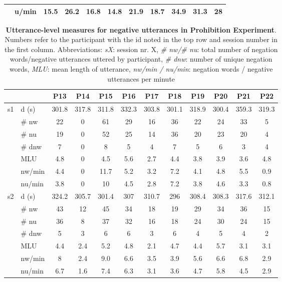 \begin{screenonly}
\begin{table*}[h]
\begin{tabular*}{\hsize}{@{\extracolsep{\fill}}lllllllllll}
    & u/min & 15.5 & 26.2 & 16.8 & 14.8 & 21.9 & 18.7 & 34.9 & 31.3 & 28 \\
    \bottomrule
  \end{tabular*}
\end{table*}
\begin{table*}[h]
\caption{\textbf{Utterance-level measures for negative utterances in Prohibition Experiment}. Numbers refer to the participant with
    the id noted in the top row and session number in the first column. Abbreviations: \textsl{sX}: session nr. X, \textsl{\# nw/\# nu}: total
    number of negation words/negative utterances uttered by participant, \textsl{\# dnw}: number of unique negation words, \textsl{MLU}: mean
    length of utterance, \textsl{nw/min / nu/min}: negation words / negative utterances per minute}
  \begin{tabular*}{\hsize}{@{\extracolsep{\fill}}clcccccccccc}
    \toprule
    & & P13 & P14 & P15 & P16 & P17 & P18 & P19 & P20 & P21 & P22\\
    \midrule
    \multirow{7}{*}{s1} & d (s) & 301.8 & 317.8 & 311.8 & 332.3 & 303.8 & 301.1 & 318.9 & 300.4 & 359.3 & 319.3\\
    & \# nw & 22 & 0 & 61 & 29 & 16 & 36 & 22 & 24 & 33 & 5\\
    & \# nu & 19 & 0 & 52 & 25 & 14 & 36 & 20 & 23 & 20 & 4\\
    & \# dnw & 7 & 0 & 8 & 5 & 4 & 7 & 5 & 6 & 3 & 4\\
    & MLU & 4.8 & 0 & 4.5 & 5.6 & 2.7 & 4.4 & 3.8 & 3.9 & 3.6 & 4.8\\
    & nw/min & 4.4 & 0 & 11.7 & 5.2 & 3.2 & 7.2 & 4.1 & 4.8 & 5.5 & 0.9\\
    & nu/min & 3.8 & 0 & 10 & 4.5 & 2.8 & 7.2 & 3.8 & 4.6 & 3.3 & 0.8\\
    \cmidrule{2-12}
    \multirow{7}{*}{s2} & d (s) & 324.2 & 305.7 & 301.4 & 307 & 310.7 & 296 & 308.4 & 308.3 & 317.6 & 312.1\\
    & \# nw & 43 & 12 & 45 & 34 & 18 & 19 & 29 & 34 & 36 & 15\\
    & \# nu & 36 & 8 & 37 & 32 & 16 & 18 & 24 & 30 & 24 & 15\\
    & \# dnw & 5 & 3 & 6 & 6 & 3 & 6 & 4 & 5 & 4 & 2\\
    & MLU & 4.4 & 2.4 & 5.2 & 4.8 & 2.1 & 4.7 & 4.4 & 5.7 & 3.1 & 3.1\\
    & nw/min & 8 & 2.4 & 9.0 & 6.6 & 3.5 & 3.9 & 5.6 & 6.6 & 6.8 & 2.9\\
    & nu/min & 6.7 & 1.6 & 7.4 & 6.3 & 3.1 & 3.6 & 4.7 & 5.8 & 4.5 & 2.9\\

\end{tabular*}
\end{table*}
\end{screenonly}
